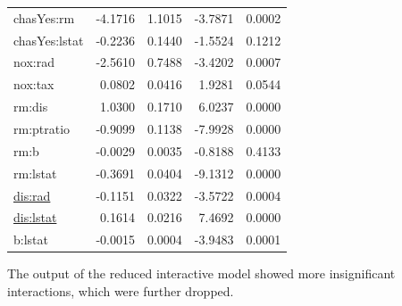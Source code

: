 \documentclass[
]{article}
\begin{document}
\begin{longtable}[]{@{}lrrrr@{}}
chasYes:rm & -4.1716 & 1.1015 & -3.7871 & 0.0002 \\
chasYes:lstat & -0.2236 & 0.1440 & -1.5524 & 0.1212 \\
nox:rad & -2.5610 & 0.7488 & -3.4202 & 0.0007 \\
nox:tax & 0.0802 & 0.0416 & 1.9281 & 0.0544 \\
rm:dis & 1.0300 & 0.1710 & 6.0237 & 0.0000 \\
rm:ptratio & -0.9099 & 0.1138 & -7.9928 & 0.0000 \\
rm:b & -0.0029 & 0.0035 & -0.8188 & 0.4133 \\
rm:lstat & -0.3691 & 0.0404 & -9.1312 & 0.0000 \\
\url{dis:rad} & -0.1151 & 0.0322 & -3.5722 & 0.0004 \\
\url{dis:lstat} & 0.1614 & 0.0216 & 7.4692 & 0.0000 \\
b:lstat & -0.0015 & 0.0004 & -3.9483 & 0.0001 \\
\end{longtable}

The output of the reduced interactive model showed more insignificant
interactions, which were further dropped.
\end{document}
